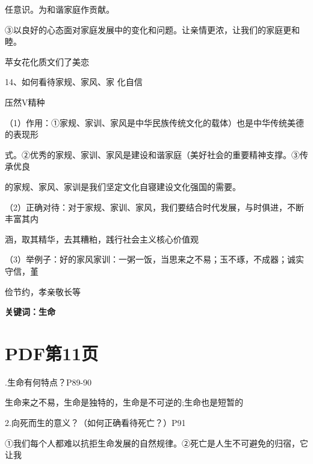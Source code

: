 \documentclass[lang=cn,11pt]{elegantbook}
\newcommand{\daofasym}[1]{{\daofasymbolfont #1}}
\newcommand{\daofasym}[1]{#1}
\begin{document}
任意识。为和谐家庭作贡献。\par

\daofasym{③}以良好的心态面对家庭发展中的变化和问题。让亲情更浓，让我们的家庭更和睦。\par

苹女花化质文们了美恋\par

14、如何看待家规、家风、家 化自信\par

压然V精种\par

（1）作用：\daofasym{①}家规、家训、家风是中华民族传统文化的载体）也是中华传统美德的表现形\par

式。\daofasym{②}优秀的家规、家训、家风是建设和谐家庭（美好社会的重要精神支撑。\daofasym{③}传承优良\par

的家规、家风、家训是我们坚定文化自寝建设文化强国的需要。\par

（2）正确对待：对于家规、家训、家风，我们要结合时代发展，与时俱进，不断丰富其内\par

涵，取其精华，去其糟粕，践行社会主义核心价值观\par

（3）举例子：好的家风家训：一粥一饭，当思来之不易；玉不琢，不成器；诚实守信，堇\par

俭节约，孝亲敬长等\par

\textbf{关键词：生命}\par


\section*{PDF第11页}

.生命有何特点？P89-90\par

生命来之不易，生命是独特的，生命是不可逆的;生命也是短暂的\par

2.向死而生的意义？（如何正确看待死亡？）P91\par

\daofasym{①}我们每个人都难以抗拒生命发展的自然规律。\daofasym{②}死亡是人生不可避免的归宿，它让我\par
\end{document}
